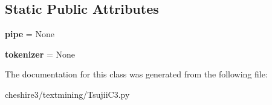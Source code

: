 \subsection*{Static Public Attributes}
\begin{DoxyCompactItemize}
\item 
\hypertarget{classcheshire3_1_1textmining_1_1_tsujii_c3_1_1_enju_object_a150ad63d9277c7fb4e2dd48120931477}{{\bfseries pipe} = None}\label{classcheshire3_1_1textmining_1_1_tsujii_c3_1_1_enju_object_a150ad63d9277c7fb4e2dd48120931477}

\item 
\hypertarget{classcheshire3_1_1textmining_1_1_tsujii_c3_1_1_enju_object_a70efec6897d4bbb70f7b43dfdd9b2389}{{\bfseries tokenizer} = None}\label{classcheshire3_1_1textmining_1_1_tsujii_c3_1_1_enju_object_a70efec6897d4bbb70f7b43dfdd9b2389}

\end{DoxyCompactItemize}


The documentation for this class was generated from the following file\-:\begin{DoxyCompactItemize}
\item 
cheshire3/textmining/Tsujii\-C3.\-py\end{DoxyCompactItemize}
